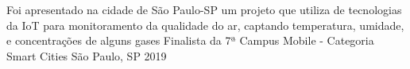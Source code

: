 
\begin{cventries}
  \cventry
    {Foi apresentado na cidade de São Paulo-SP um projeto que utiliza de tecnologias da IoT para monitoramento da qualidade do ar, captando temperatura, umidade, e concentrações de alguns gases}
    {Finalista da 7ª Campus Mobile - Categoria Smart Cities}
    {São Paulo, SP}
    {2019}
    {}
\end{cventries}
